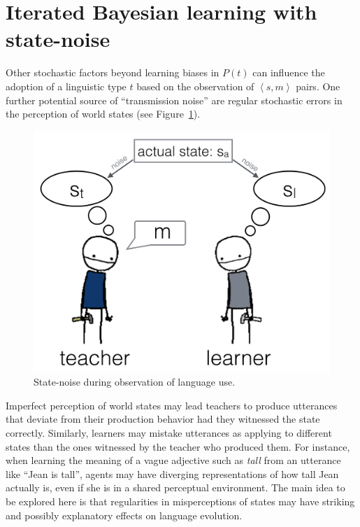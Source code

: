 \documentclass[10pt,a4paper]{article}
\newcommand{\tuple}[1]{\ensuremath{\left\langle #1 \right\rangle}}
\begin{document}

\section{Iterated Bayesian learning with state-noise}

Other stochastic factors beyond learning biases in $P(t)$ can influence the adoption of a
linguistic type $t$ based on the observation of $\tuple{s,m}$ pairs. One further potential source
of ``transmission noise'' are regular stochastic errors in the perception of world states (see
Figure~\ref{fig:cartoon}).
%
\begin{figure}[t]
  \centering
  \includegraphics[width = 0.75\linewidth]{pics/cartoon_picture.png}
  \caption{State-noise during observation of language use.}
  \label{fig:cartoon}
\end{figure}
% 
Imperfect perception of world states may lead teachers to produce utterances that deviate from
their production behavior had they witnessed the state correctly. Similarly, learners may
mistake utterances as applying to different states than the ones witnessed by the teacher who
produced them. For instance, when learning the meaning of a vague adjective such as {\em tall}
from an utterance like ``Jean is tall'', agents may have diverging representations of how tall
Jean actually is, even if she is in a shared perceptual environment. The main idea to be
explored here is that regularities in misperceptions of states may have striking and possibly
explanatory effects on language evolution.
\end{document}
